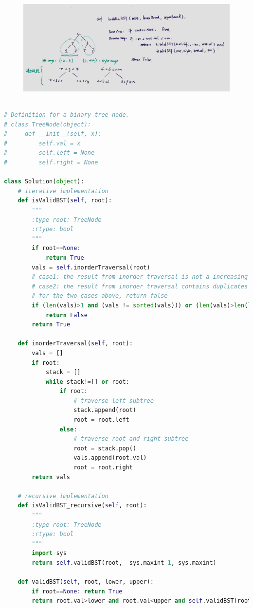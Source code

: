 \documentclass[a4paper,10pt]{article}
\begin{document}
\begin{figure}[h]
    \includegraphics[width=1\textwidth]{leetcode98.jpg}
    \centering\\
\end{figure}


\begin{lstlisting}[language=Python, caption=Problem98. Validate Binary Search Tree]

# Definition for a binary tree node.
# class TreeNode(object):
#     def __init__(self, x):
#         self.val = x
#         self.left = None
#         self.right = None

class Solution(object):
    # iterative implementation
    def isValidBST(self, root):
        """
        :type root: TreeNode
        :rtype: bool
        """
        if root==None:
            return True
        vals = self.inorderTraversal(root)
        # case1: the result from inorder traversal is not a increasing sequence
        # case2: the result from inorder traversal contains duplicates
        # for the two cases above, return false
        if (len(vals)>1 and (vals != sorted(vals))) or (len(vals)>len(list(set(vals)))):
            return False
        return True
    
    def inorderTraversal(self, root):
        vals = []
        if root:
            stack = []
            while stack!=[] or root:
                if root:
                    # traverse left subtree
                    stack.append(root)
                    root = root.left
                else:
                    # traverse root and right subtree
                    root = stack.pop()
                    vals.append(root.val)
                    root = root.right
        return vals
        
    # recursive implementation
    def isValidBST_recursive(self, root):
        """
        :type root: TreeNode
        :rtype: bool
        """
        import sys
        return self.validBST(root, -sys.maxint-1, sys.maxint)
    
    def validBST(self, root, lower, upper):
        if root==None: return True
        return root.val>lower and root.val<upper and self.validBST(root.left, lower, root.val) and self.validBST(root.right, root.val, upper)
\end{lstlisting}
\end{document}
